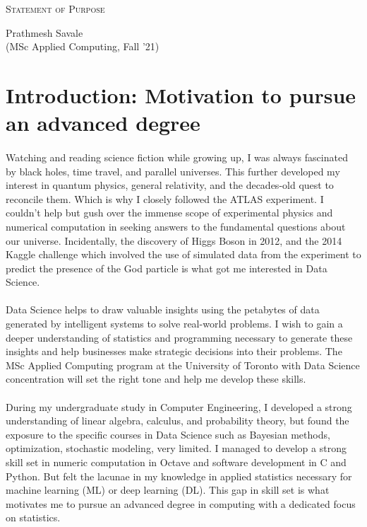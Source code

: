 \documentclass[letterpaper]{article}
\newcommand{\soptitle}{Statement of Purpose}
\newcommand{\yourname}{Prathmesh Savale}
\newcommand{\youremail}{(MSc Applied Computing, Fall '21)}
\begin{document}
\begin{center}{\huge \scshape \soptitle}\end{center}
\begin{center}\vspace{0.2em} {\Large \yourname\\}
  {\youremail}\end{center}

\section*{Introduction: Motivation to pursue an advanced degree}
\paragraph{}
Watching and reading science fiction while growing up, I was always fascinated by black holes, time travel, and parallel universes. This further developed my interest in quantum physics, general relativity, and the decades-old quest to reconcile them. Which is why I closely followed the ATLAS experiment. I couldn't help but gush over the immense scope of experimental physics and numerical computation in seeking answers to the fundamental questions about our universe. Incidentally, the discovery of Higgs Boson in 2012, and the 2014 Kaggle challenge which involved the use of simulated data from the experiment to predict the presence of the God particle is what got me interested in Data Science.

\paragraph{}
Data Science helps to draw valuable insights using the petabytes of data generated by intelligent
systems to solve real-world problems. I wish to gain a deeper understanding of statistics and
programming necessary to generate these insights and help businesses make strategic decisions into their problems. The MSc Applied Computing program at the University of Toronto with Data Science concentration will set the right tone and help me develop these skills.


\paragraph{}
During my undergraduate study in Computer Engineering, I developed a strong understanding of linear algebra, calculus, and probability theory, but found the exposure to the specific courses in Data Science such as Bayesian methods, optimization, stochastic modeling, very limited. I managed to develop a strong skill set in numeric computation in Octave and software development in C and Python. But felt the lacunae in my knowledge in applied statistics necessary for machine learning (ML) or deep learning (DL). This gap in skill set is what motivates me to pursue an advanced degree in computing with a dedicated focus on statistics. 
\end{document}

